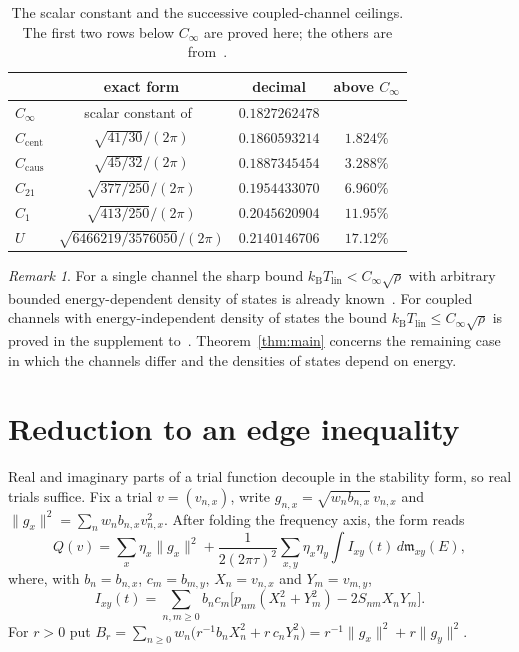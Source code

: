 \documentclass[10pt]{article}
\theoremstyle{remark}
\newtheorem{remark}[theorem]{Remark}
\newcommand{\kB}{k_{\mathrm B}}
\newcommand{\Tlin}{T_{\mathrm{lin}}}
\newcommand{\Cinf}{C_\infty}
\newcommand{\Ccent}{C_{\mathrm{cent}}}
\newcommand{\Ccaus}{C_{\mathrm{caus}}}
\begin{document}
\begin{table}[t]
\centering
\begin{tabular}{@{}lccc@{}}
\hline
 & exact form & decimal & above $\Cinf$ \\
\hline
$\Cinf$ & scalar constant of~\cite{finite} & $0.1827262478$ & \\
$\Ccent$ & $\sqrt{41/30}/(2\pi)$ & $0.1860593214$ & $1.824\%$ \\
$\Ccaus$ & $\sqrt{45/32}/(2\pi)$ & $0.1887345454$ & $3.288\%$ \\
$C_{21}$ & $\sqrt{377/250}/(2\pi)$ & $0.1954433070$ & $6.960\%$ \\
$C_1$ & $\sqrt{413/250}/(2\pi)$ & $0.2045620904$ & $11.95\%$ \\
$U$ & $\sqrt{6466219/3576050}/(2\pi)$ & $0.2140146706$ & $17.12\%$ \\
\hline
\end{tabular}
\caption{The scalar constant and the successive coupled-channel ceilings. The first two rows below $\Cinf$ are proved here; the others are from~\cite{predecessor,optimum}.}\label{tab:constants}
\end{table}

\begin{remark}
For a single channel the sharp bound $\kB\Tlin<\Cinf\sqrt\rho$ with arbitrary bounded energy-dependent density of states is already known~\cite{finite}. For coupled channels with energy-independent density of states the bound $\kB\Tlin\le\Cinf\sqrt\rho$ is proved in the supplement to~\cite{predecessor}. Theorem~\ref{thm:main} concerns the remaining case in which the channels differ and the densities of states depend on energy.
\end{remark}

\section{Reduction to an edge inequality}\label{sec:reduction}

Real and imaginary parts of a trial function decouple in the stability form, so real trials suffice. Fix a trial $v=(v_{n,x})$, write $g_{n,x}=\sqrt{w_nb_{n,x}}\,v_{n,x}$ and $\|g_x\|^2=\sum_nw_nb_{n,x}v_{n,x}^2$. After folding the frequency axis, the form reads
\begin{equation}\label{eq:form}
Q(v)=\sum_x\eta_x\|g_x\|^2+\frac1{2(2\pi\tau)^2}\sum_{x,y}\eta_x\eta_y\int I_{xy}(t)\,d\mathfrak m_{xy}(E),
\end{equation}
where, with $b_n=b_{n,x}$, $c_m=b_{m,y}$, $X_n=v_{n,x}$ and $Y_m=v_{m,y}$,
\[
I_{xy}(t)=\sum_{n,m\ge0}b_nc_m\bigl[p_{nm}(X_n^2+Y_m^2)-2S_{nm}X_nY_m\bigr].
\]
For $r>0$ put $B_r=\sum_{n\ge0}w_n\bigl(r^{-1}b_nX_n^2+r\,c_nY_n^2\bigr)=r^{-1}\|g_x\|^2+r\|g_y\|^2$.
\end{document}
